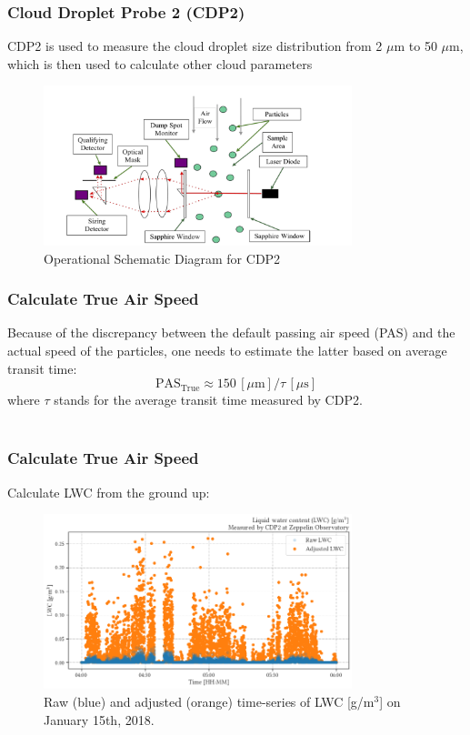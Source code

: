 \documentclass{beamer}
\begin{document}
\begin{frame}
    \frametitle{Cloud Droplet Probe 2 (CDP2)}
    CDP2 is used to measure the cloud droplet size distribution from 2 $\mu$m to 50 $\mu$m, which is then used to calculate other cloud parameters

    \begin{figure}
        \centering
        \includegraphics[width=0.8\textwidth]{img/cdp_op.png}
        \caption{ Operational Schematic Diagram for CDP2 }
    \end{figure}
\end{frame}

\begin{frame}
    \frametitle{Calculate True Air Speed}
    Because of the discrepancy between the default passing air speed (PAS) and the actual speed of the particles, one needs to estimate the latter based on average transit time:
    \begin{equation*}
         \mathrm{PAS}_\mathrm{True} \approx 150 \, [\mu \mathrm{m}] / \tau \, [\mu \mathrm{s}]
    \end{equation*}
    where $\tau$ stands for the average transit time measured by CDP2.\\~\
\end{frame}

\begin{frame}
    \frametitle{Calculate True Air Speed}
    Calculate LWC from the ground up:

    \begin{figure}
        \centering
        \includegraphics[width=0.8\textwidth]{img/pas.png}
        \caption{ Raw (blue) and adjusted (orange) time-series of LWC [g/m$^3$] on January 15th, 2018. }
    \end{figure}
\end{frame}
\end{document}
